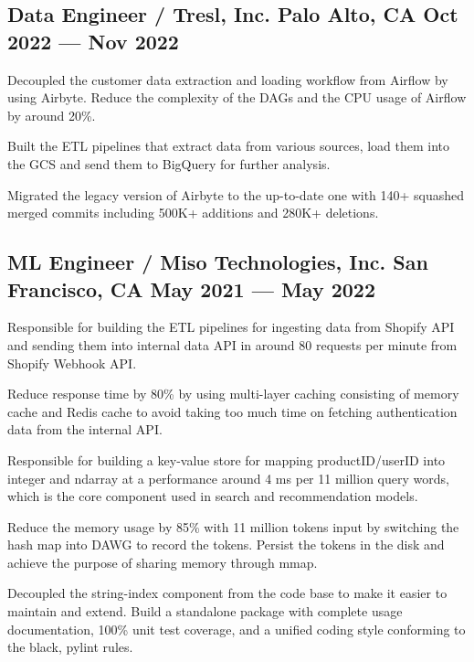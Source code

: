 \subsection{{Data Engineer / Tresl, Inc. \hfill Palo Alto, CA \> Oct 2022 --- Nov 2022}}
\begin{zitemize}
\item Decoupled the customer data extraction and loading workflow from Airflow by using Airbyte. Reduce the complexity of the DAGs and the CPU usage of Airflow by around 20\%.
\item Built the ETL pipelines that extract data from various sources, load them into the GCS and send them to BigQuery for further analysis.
\item Migrated the legacy version of Airbyte to the up-to-date one with 140+ squashed merged commits including 500K+ additions and 280K+ deletions.
\end{zitemize}


\subsection{{ML Engineer / Miso Technologies, Inc.  \hfill San Francisco, CA \> May 2021 --- May 2022}}

\begin{zitemize}
\item Responsible for building the ETL pipelines for ingesting data from Shopify API and sending them into internal data API in around 80 requests per minute from Shopify Webhook API.
\item Reduce response time by 80\% by using multi-layer caching consisting of memory cache and Redis cache to avoid taking too much time on fetching authentication data from the internal API.
\end{zitemize}


\begin{zitemize}
\item Responsible for building a key-value store for mapping productID/userID into integer and ndarray at a performance around 4 ms per 11 million query words, which is the core component used in search and recommendation models.
\item Reduce the memory usage by 85\% with 11 million tokens input by switching the hash map into DAWG to record the tokens. Persist the tokens in the disk and achieve the purpose of sharing memory through mmap.
\item Decoupled the string-index component from the code base to make it easier to maintain and extend. Build a standalone package with complete usage documentation, 100\% unit test coverage, and a unified coding style conforming to the black, pylint rules.
\end{zitemize}

